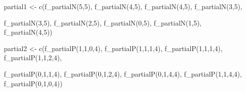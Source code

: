 \documentclass[
  letterpaper,
  DIV=11,
  numbers=noendperiod]{scrreprt}
\newenvironment{Shaded}{\begin{snugshade}}{\end{snugshade}}
\newcommand{\DecValTok}[1]{\textcolor[rgb]{0.68,0.00,0.00}{#1}}
\newcommand{\FunctionTok}[1]{\textcolor[rgb]{0.28,0.35,0.67}{#1}}
\newcommand{\NormalTok}[1]{\textcolor[rgb]{0.00,0.23,0.31}{#1}}
\newcommand{\OtherTok}[1]{\textcolor[rgb]{0.00,0.23,0.31}{#1}}
\begin{document}
\begin{Shaded}
\begin{Highlighting}[]
\NormalTok{partial1 }\OtherTok{\textless{}{-}} \FunctionTok{c}\NormalTok{(}\FunctionTok{f\_partialN}\NormalTok{(}\DecValTok{5}\NormalTok{,}\DecValTok{5}\NormalTok{), }
              \FunctionTok{f\_partialN}\NormalTok{(}\DecValTok{4}\NormalTok{,}\DecValTok{5}\NormalTok{), }
              \FunctionTok{f\_partialN}\NormalTok{(}\DecValTok{4}\NormalTok{,}\DecValTok{5}\NormalTok{), }
              \FunctionTok{f\_partialN}\NormalTok{(}\DecValTok{3}\NormalTok{,}\DecValTok{5}\NormalTok{), }
              
              \FunctionTok{f\_partialN}\NormalTok{(}\DecValTok{3}\NormalTok{,}\DecValTok{5}\NormalTok{), }
              \FunctionTok{f\_partialN}\NormalTok{(}\DecValTok{2}\NormalTok{,}\DecValTok{5}\NormalTok{),}
              \FunctionTok{f\_partialN}\NormalTok{(}\DecValTok{0}\NormalTok{,}\DecValTok{5}\NormalTok{),}
              \FunctionTok{f\_partialN}\NormalTok{(}\DecValTok{1}\NormalTok{,}\DecValTok{5}\NormalTok{),}
              \FunctionTok{f\_partialN}\NormalTok{(}\DecValTok{4}\NormalTok{,}\DecValTok{5}\NormalTok{))}

\NormalTok{partial2 }\OtherTok{\textless{}{-}} \FunctionTok{c}\NormalTok{(}\FunctionTok{f\_partialP}\NormalTok{(}\DecValTok{1}\NormalTok{,}\DecValTok{1}\NormalTok{,}\DecValTok{0}\NormalTok{,}\DecValTok{4}\NormalTok{), }
              \FunctionTok{f\_partialP}\NormalTok{(}\DecValTok{1}\NormalTok{,}\DecValTok{1}\NormalTok{,}\DecValTok{1}\NormalTok{,}\DecValTok{4}\NormalTok{), }
              \FunctionTok{f\_partialP}\NormalTok{(}\DecValTok{1}\NormalTok{,}\DecValTok{1}\NormalTok{,}\DecValTok{1}\NormalTok{,}\DecValTok{4}\NormalTok{), }
              \FunctionTok{f\_partialP}\NormalTok{(}\DecValTok{1}\NormalTok{,}\DecValTok{1}\NormalTok{,}\DecValTok{2}\NormalTok{,}\DecValTok{4}\NormalTok{), }
              
              \FunctionTok{f\_partialP}\NormalTok{(}\DecValTok{0}\NormalTok{,}\DecValTok{1}\NormalTok{,}\DecValTok{1}\NormalTok{,}\DecValTok{4}\NormalTok{),}
              \FunctionTok{f\_partialP}\NormalTok{(}\DecValTok{0}\NormalTok{,}\DecValTok{1}\NormalTok{,}\DecValTok{2}\NormalTok{,}\DecValTok{4}\NormalTok{),}
              \FunctionTok{f\_partialP}\NormalTok{(}\DecValTok{0}\NormalTok{,}\DecValTok{1}\NormalTok{,}\DecValTok{4}\NormalTok{,}\DecValTok{4}\NormalTok{),}
              \FunctionTok{f\_partialP}\NormalTok{(}\DecValTok{1}\NormalTok{,}\DecValTok{1}\NormalTok{,}\DecValTok{4}\NormalTok{,}\DecValTok{4}\NormalTok{), }
              \FunctionTok{f\_partialP}\NormalTok{(}\DecValTok{0}\NormalTok{,}\DecValTok{1}\NormalTok{,}\DecValTok{0}\NormalTok{,}\DecValTok{4}\NormalTok{))}


\end{Highlighting}
\end{Shaded}
\end{document}
